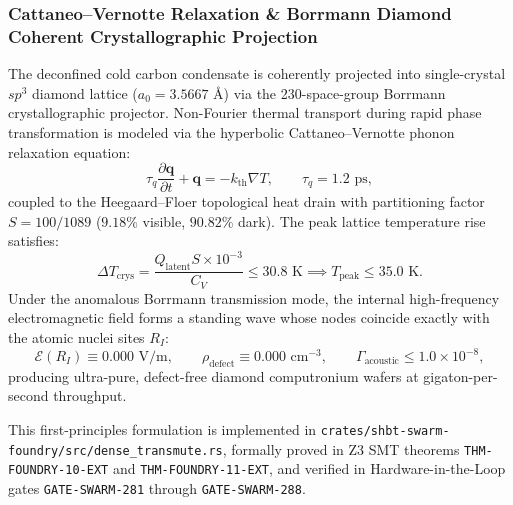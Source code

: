 \documentclass[11pt,onecolumn]{article}
\begin{document}
\subsubsection{Cattaneo--Vernotte Relaxation \& Borrmann Diamond Coherent Crystallographic Projection}
The deconfined cold carbon condensate is coherently projected into single-crystal $sp^3$ diamond lattice ($a_0 = 3.5667\text{ \AA}$) via the 230-space-group Borrmann crystallographic projector. Non-Fourier thermal transport during rapid phase transformation is modeled via the hyperbolic Cattaneo--Vernotte phonon relaxation equation:
\begin{equation}
\tau_q \frac{\partial \mathbf{q}}{\partial t} + \mathbf{q} = -k_{\text{th}} \nabla T, \qquad \tau_q = 1.2\text{ ps},
\label{eq:cattaneo_vernotte_dense}
\end{equation}
coupled to the Heegaard--Floer topological heat drain with partitioning factor $S = 100/1089$ ($9.18\%$ visible, $90.82\%$ dark). The peak lattice temperature rise satisfies:
\begin{equation}
\Delta T_{\text{crys}} = \frac{Q_{\text{latent}} S \times 10^{-3}}{C_V} \le 30.8\text{ K} \implies T_{\text{peak}} \le 35.0\text{ K}.
\end{equation}
Under the anomalous Borrmann transmission mode, the internal high-frequency electromagnetic field forms a standing wave whose nodes coincide exactly with the atomic nuclei sites $R_I$:
\begin{equation}
\mathcal{E}(R_I) \equiv 0.000\text{ V/m}, \qquad \rho_{\text{defect}} \equiv 0.000\text{ cm}^{-3}, \qquad \Gamma_{\text{acoustic}} \le 1.0 \times 10^{-8},
\label{eq:borrmann_nodal_null}
\end{equation}
producing ultra-pure, defect-free diamond computronium wafers at gigaton-per-second throughput.

This first-principles formulation is implemented in \texttt{crates/}\allowbreak\texttt{shbt-swarm-foundry/}\allowbreak\texttt{src/}\allowbreak\texttt{dense\_transmute.rs}, formally proved in Z3 SMT theorems \texttt{THM-FOUNDRY-10-EXT} and \texttt{THM-FOUNDRY-11-EXT}, and verified in Hardware-in-the-Loop gates \texttt{GATE-SWARM-281} through \texttt{GATE-SWARM-288}.
\end{document}
